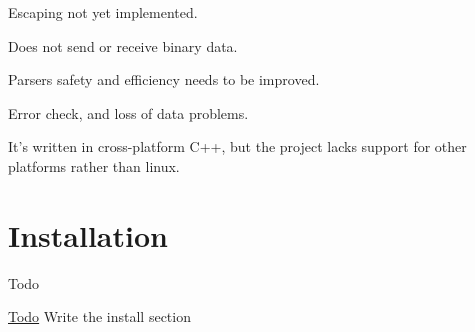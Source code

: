 \begin{DoxyItemize}
\item Escaping not yet implemented.
\item Does not send or receive binary data.
\item Parsers safety and efficiency needs to be improved.
\item Error check, and loss of data problems.
\item It's written in cross-\/platform C++, but the project lacks support for other platforms rather than linux.
\end{DoxyItemize}\hypertarget{index_install}{}\section{Installation}\label{index_install}
\begin{DoxyRefDesc}{Todo}
\item[\hyperlink{todo__todo000002}{Todo}]Write the install section \end{DoxyRefDesc}
